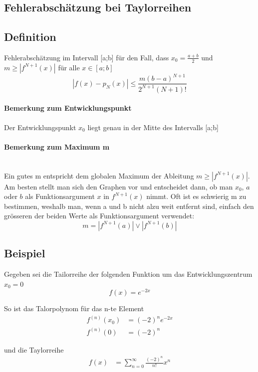 \subsection{Fehlerabschätzung bei Taylorreihen}

\subsection{Definition}
Fehlerabschätzung im Intervall [a;b] für den Fall, dass $x_0 = \frac{a+b}{2}$ und $m \geq |f^{N+1}(x)|$ für alle $x\in [a;b]$
\[
|f(x) - p_{N}(x) | \leq \frac{m(b-a)^{N+1}}{2^{N+1}(N+1)!}
\]

\paragraph{Bemerkung zum Entwicklungspunkt} Der Entwicklungspunkt $x_0$ liegt genau in der Mitte des Intervalls [a;b]

\paragraph{Bemerkung zum Maximum m} \hfill \\
Ein gutes m entspricht dem globalen Maximum der Ableitung $m \geq |f^{N+1}(x)|$. Am besten stellt man sich den Graphen vor und entscheidet dann, ob man $x_0$, $a$ oder $b$ als Funktionsargument $x$ in $f^{N+1}(x)$ nimmt. Oft ist es schwierig m zu bestimmen, weshalb man, wenn a und b nicht alzu weit entfernt sind, einfach den grösseren der beiden Werte als Funktionsargument verwendet:
\[
	m = |f^{N+1}(a)| \lor |f^{N+1}(b)|
\]

\subsection{Beispiel}
Gegeben sei die Tailorreihe der folgenden Funktion um das Entwicklungszentrum $x_0 = 0$
\[
	f(x) = e^{-2x}
\]

So ist das Talorpolynom für das n-te Element 
\begin{align*}
	f^{(n)}(x_0) &= (-2)^n e^{-2x} \\
	f^{(n)}(0) &= (-2)^n
\end{align*}

und die Taylorreihe
\begin{align*}
f(x) &= \sum_{n=0}^{\infty} \frac{(-2)^n}{n!}x^n
\end{align*}

